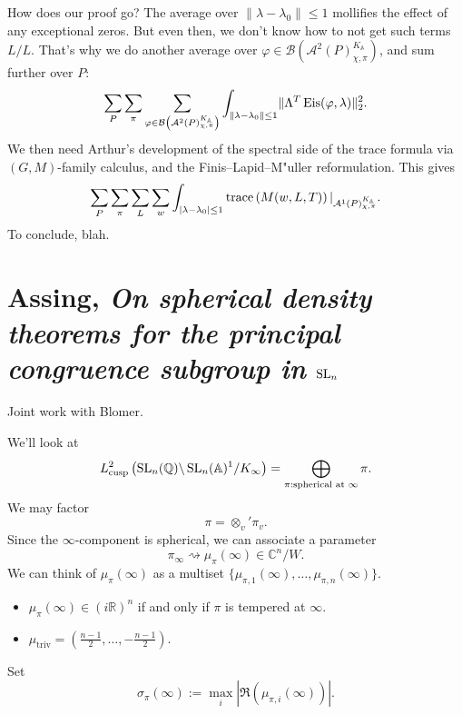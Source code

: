 \documentclass[reqno]{amsart} 
\begin{document}
How does our proof go?  The average over $\lVert \lambda - \lambda_0  \rVert \leq 1$ mollifies the effect of any exceptional zeros.  But even then, we don't know how to not get such terms $L / L$.  That's why we do another average over $\varphi \in \mathcal{B} \left(\mathcal{A}^2 (P)^{K_{\mathbb{A}}}_{\chi, \pi }\right)$, and sum further over $P$:
\begin{equation*}
  \sum_P \sum_\pi
  \sum_{\varphi \in \mathcal{B} \left( \mathcal{A}^2 (P)^{K_{\mathbb{A}}}_{\chi, \pi } \right)}
  \int_{\lVert \lambda - \lambda_0  \rVert \leq 1}
  \lVert \Lambda^T \operatorname{Eis} (\varphi, \lambda ) \rVert_2^2.
\end{equation*}
We then need Arthur's development of the spectral side of the trace formula via $(G, M)$-family calculus, and the Finis--Lapid--M{"u}ller reformulation.  This gives
\begin{equation*}
  \sum_P \sum_\pi \sum_L \sum_w \int_{\lvert \lambda - \lambda_0  \rvert \leq 1}
  \operatorname{trace} \left( 
    M (w, L, T) 
  \right)
  \vert_{\mathcal{A}^1 (P)_{\chi, \pi }^{K_{\mathbb{A}}}}.
\end{equation*}
To conclude, blah.





\section{Assing, \emph{On spherical density theorems for the principal congruence subgroup in} $\operatorname{SL}_n$}
Joint work with Blomer.

We'll look at
\begin{equation*}
  L^2_{\operatorname{cusp}}\left( \operatorname{SL}_n (\mathbb{Q} ) \backslash \operatorname{SL}_n (\mathbb{A} )^1 / K _\infty \right)
  = \bigoplus_{\pi : \text{spherical at } \infty }
  \pi.
\end{equation*}
We may factor
\begin{equation*}
\pi = \otimes_v ' \pi_v.
\end{equation*}
Since the $\infty$-component is spherical, we can associate a parameter
\begin{equation*}
\pi _\infty \rightsquigarrow \mu_\pi (\infty ) \in \mathbb{C}^n / W.
\end{equation*}
We can think of $\mu_\pi (\infty) $ as a multiset $\{\mu_{\pi , 1} (\infty), \dotsc, \mu_{\pi, n} (\infty) \}$.
\begin{itemize}
\item $\mu_\pi (\infty) \in (i \mathbb{R} )^n $ if and only if $\pi $ is tempered at $\infty$.
\item $\mu_{\mathrm{triv}} = \left( \frac{n - 1}{2}, \dotsc, -\frac{n-1}{2} \right).$
\end{itemize}
Set
\begin{equation*}
\sigma_\pi (\infty) := \max_i \left\lvert \Re \left( \mu_{\pi, i} (\infty)  \right) \right\rvert.
\end{equation*}
\end{document}
